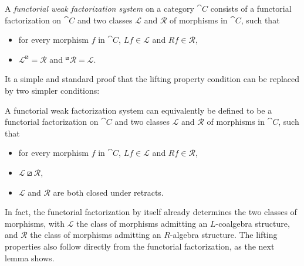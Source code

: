 \begin{definition}
	A \emph{functorial weak factorization system} on a category $\cat{C}$ consists of a functorial factorization on $\cat{C}$ and two classes $\mathcal{L}$ and $\mathcal{R}$ of morphisms in $\cat{C}$, such that
	\begin{itemize}
		\item for every morphism $f$ in $\cat{C}$, $Lf\in\mathcal{L}$ and $Rf\in\mathcal{R}$,
		\item $\mathcal{L}^{\boxslash}=\mathcal{R}$ and ${}^{\boxslash}\!\mathcal{R}=\mathcal{L}$.
	\end{itemize}
\end{definition}

It a simple and standard proof that the lifting property condition can be replaced by two simpler conditions:

\begin{lemma}
	A functorial weak factorization system can equivalently be defined to be a functorial factorization on $\cat{C}$ and two classes $\mathcal{L}$ and $\mathcal{R}$ of morphisms in $\cat{C}$, such that
	\begin{itemize}
		\item for every morphism $f$ in $\cat{C}$, $Lf\in\mathcal{L}$ and $Rf\in\mathcal{R}$,
		\item $\mathcal{L}\boxslash\mathcal{R}$,
		\item $\mathcal{L}$ and $\mathcal{R}$ are both closed under retracts.
	\end{itemize}
\end{lemma}

In fact, the functorial factorization by itself already determines the two classes of morphisms, with $\mathcal{L}$ the class of morphisms admitting an $L$-coalgebra structure, and $\mathcal{R}$ the class of morphisms admitting an $R$-algebra structure. The lifting properties also follow directly from the functorial factorization, as the next lemma shows.

